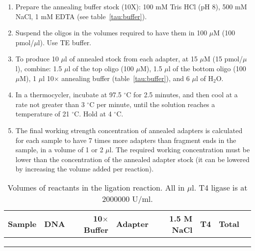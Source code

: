 \documentclass[a4paper,12pt]{article}
\begin{document}
\begin{enumerate}
\item Prepare the annealing buffer stock (10X): 100 mM Tris HCl (pH 8), 500 mM NaCl, 1 mM EDTA (see table~\ref{tau:buffer}).
\item Suspend the oligos in the volumes required to have them in 100 $\mu$M (100 pmol/$\mu$l). Use TE buffer.
\item To produce 10 $\mu$l of annealed stock from each adapter, at 15 $\mu$M (15 pmol/$\mu$l), combine: 1.5 $\mu$l of the top oligo (100 $\mu$M), 1.5 $\mu$l of the bottom oligo (100 $\mu$M), 1 $\mu$l 10$\times$ annealing buffer (table~\ref{tau:buffer}), and 6 $\mu$l of H$_2$O. 
\item In a thermocycler, incubate at 97.5 $^{\circ}$C for 2.5 minutes, and then cool at a rate not greater than 3 $^{\circ}$C per minute, until the solution reaches a temperature of 21 $^{\circ}$C. Hold at 4 $^{\circ}$C.
\item The final working strength concentration of annealed adapters is calculated for each sample to have 7 times more adapters than fragment ends in the sample, in a volume of 1 or 2 $\mu$l. The required working concentration must be lower than the concentration of the annealed adapter stock (it can be lowered by increasing the volume added per reaction).
\end{enumerate}

\begin{table}
\caption{Volumes of reactants in the ligation reaction. All in $\mu$l. T4 ligase is at 2000000 U/ml.}\label{tau:ligation}
\vspace*{0.2cm}
\begin{tabular}{lrrrrrrr}
\toprule
Sample&DNA&10$\times$ Buffer&Adapter&1.5 M NaCl&T4&Total\\
\midrule
&&&&&&\\
&&&&&&\\
&&&&&&\\
\bottomrule
\end{tabular}
\end{table}
\end{document}
